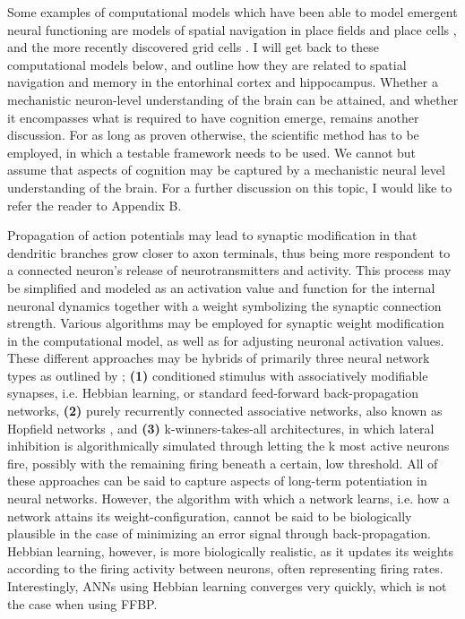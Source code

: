 Some examples of computational models which have been able to model emergent neural functioning are models of spatial navigation in place fields and place cells \citep{OKeefe1976, OKeefe1996}, and the more recently discovered grid cells \citep{Hafting2005}. I will get back to these computational models below, and outline how they are related to spatial navigation and memory in the entorhinal cortex and hippocampus.
Whether a mechanistic neuron-level understanding of the brain can be attained, and whether it encompasses what is required to have cognition emerge, remains another discussion. For as long as proven otherwise, the scientific method has to be employed, in which a testable framework needs to be used. We cannot but assume that aspects of cognition may be captured by a mechanistic neural level understanding of the brain.
For a further discussion on this topic, I would like to refer the reader to Appendix B.

Propagation of action potentials may lead to synaptic modification in that dendritic branches grow closer to axon terminals, thus being more respondent to a connected neuron's release of neurotransmitters and activity. This process may be simplified and modeled as an activation value and function for the internal neuronal dynamics together with a weight symbolizing the synaptic connection strength. Various algorithms may be employed for synaptic weight modification in the computational model, as well as for adjusting neuronal activation values. These different approaches may be hybrids of primarily three neural network types as outlined by \cite{Rolls1998chpt1};
\textbf{(1)} conditioned stimulus with associatively modifiable synapses, i.e. Hebbian learning, or standard feed-forward back-propagation networks,
\textbf{(2)} purely recurrently connected associative networks, also known as Hopfield networks \citep{Hopfield1982}, and
\textbf{(3)} k-winners-takes-all architectures, in which lateral inhibition is algorithmically simulated through letting the k most active neurons fire, possibly with the remaining firing beneath a certain, low threshold. 
All of these approaches can be said to capture aspects of long-term potentiation in neural networks. However, the algorithm with which a network learns, i.e. how a network attains its weight-configuration, cannot be said to be biologically plausible in the case of minimizing an error signal through back-propagation. Hebbian learning, however, is more biologically realistic, as it updates its weights according to the firing activity between neurons, often representing firing rates. Interestingly, ANNs using Hebbian learning converges very quickly, which is not the case when using FFBP.

